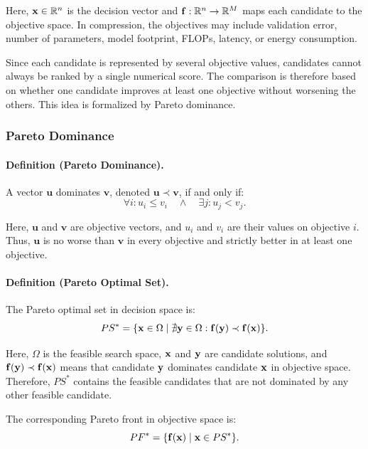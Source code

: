 Here, $\mathbf{x} \in \mathbb{R}^n$ is the decision vector and $\mathbf{f}: \mathbb{R}^n \to \mathbb{R}^M$ maps each candidate to the objective space. In compression, the objectives may include validation error, number of parameters, model footprint, FLOPs, latency, or energy consumption.

Since each candidate is represented by several objective values, candidates cannot always be ranked by a single numerical score. The comparison is therefore based on whether one candidate improves at least one objective without worsening the others. This idea is formalized by Pareto dominance.

\subsubsection{Pareto Dominance}

\paragraph{Definition (Pareto Dominance).}
A vector $\mathbf{u}$ dominates $\mathbf{v}$, denoted $\mathbf{u} \prec \mathbf{v}$, if and only if:
\begin{equation}
	\forall i: u_i \leq v_i \quad \land \quad \exists j: u_j < v_j .
\end{equation}

Here, $\mathbf{u}$ and $\mathbf{v}$ are objective vectors, and $u_i$ and $v_i$ are their values on objective $i$. Thus, $\mathbf{u}$ is no worse than $\mathbf{v}$ in every objective and strictly better in at least one objective.

\paragraph{Definition (Pareto Optimal Set).}
The Pareto optimal set in decision space is:
\begin{equation}
	PS^* = \{ \mathbf{x} \in \Omega \mid \nexists \mathbf{y} \in \Omega: \mathbf{f}(\mathbf{y}) \prec \mathbf{f}(\mathbf{x}) \}.
\end{equation}

Here, $\Omega$ is the feasible search space, $\mathbf{x}$ and $\mathbf{y}$ are candidate solutions, and $\mathbf{f}(\mathbf{y}) \prec \mathbf{f}(\mathbf{x})$ means that candidate $\mathbf{y}$ dominates candidate $\mathbf{x}$ in objective space. Therefore, $PS^*$ contains the feasible candidates that are not dominated by any other feasible candidate.

The corresponding Pareto front in objective space is:
\begin{equation}
	PF^* = \{ \mathbf{f}(\mathbf{x}) \mid \mathbf{x} \in PS^* \}.
\end{equation}

